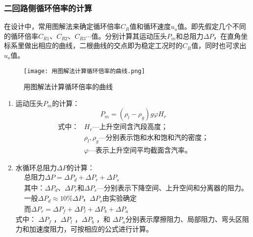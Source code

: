 \subsubsection{二回路侧循环倍率的计算}
在设计中，常用图解法来确定循环倍率$ C_R $值和循环速度$ u_o $值。即先假定几个不同的循环倍率$ C_{R1} $、$ C_{R2} $、$ C_{R3} \cdots$值。分别计算其运动压头$ P_{m} $和总阻力$ \Delta P $，在直角坐标系里做出相应的曲线，二根曲线的交点即为稳定工况时的$ C_{R} $值，同时也可求出$ u_{o} $值。
\begin{figure}[H]
    \centering
    \texttt{[image: 用图解法计算循环倍率的曲线.png]}
    \caption{用图解法计算循环倍率的曲线}
    \label{Fig.2}
\end{figure}
\begin{enumerate}
    \item 运动压头$ P_m $的计算：
          \begin{equation*}
              P_{m}=\left(\rho_{l}-\rho_{g}\right) g \varphi H_{r}
          \end{equation*}
          \begin{align*}
              \text{式中：} & H_r \text{—上升空间含汽段高度；}                         \\
                            & \rho_{l},\rho_{g} \text{—分别表示饱和水和饱和汽的密度；} \\
                            & \varphi \text{—表示上升空间平均截面含汽率。}
          \end{align*}
    \item 水循环总阻力$ \Delta P $的计算：
          \begin{align*}
               & \text{总阻力} \Delta P = \Delta P_d + \Delta P_r +\Delta P_s                                                         \\
               & \text{其中：} \Delta P_d \text{、} \Delta P_r \text{和}\Delta P_s \text{—分别表示下降空间、上升空间和分离器的阻力。} \\
               & \text{一般} \Delta P_d \approx 10\% \Delta P \text{，} \Delta P_s 由实验确定                                         \\
               & \text{而} \Delta P_{r}=\Delta P_{f}+\Delta P_{l}+\Delta P_{b}+\Delta P_{a}
          \end{align*}
          式中： $ \Delta P_{f} $ ，$ \Delta P_{l} $ ，$ \Delta P_{b} $ ，和 $ \Delta P_{a} $分别表示摩擦阻力、局部阻力、弯头区阻力和加速度阻力，可按相应的公式进行计算。
\end{enumerate}


